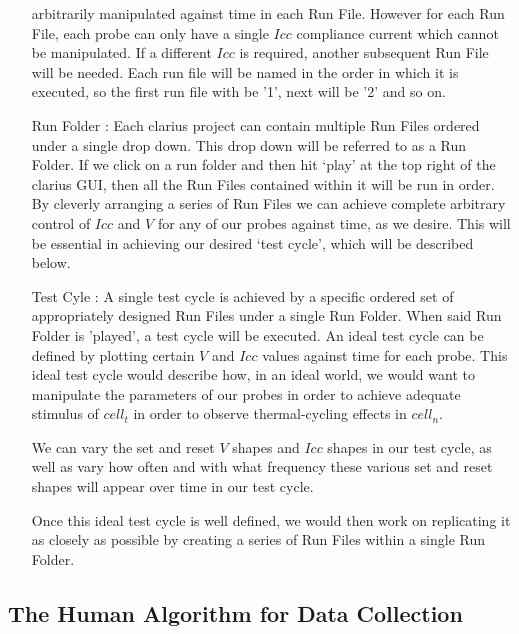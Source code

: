 \documentclass{article}
\begin{document}
\begin{enumerate}
            arbitrarily manipulated against time in each Run File. However for each Run File, each probe can only have a
            single $Icc$ compliance current which cannot be manipulated. If a different $Icc$ is required, another
            subsequent Run File will be needed. Each run file will be named in the order in which it is executed, so the
            first run file with be '1', next will be '2' and so on.
          \item[Run Folder :] Each clarius project can contain multiple Run Files ordered under a single drop down. This
            drop down will be referred to as a Run Folder. If we click on a run folder and then hit `play' at the top
            right of the clarius GUI, then all the Run Files contained within it will be run in order. By cleverly
            arranging a series of Run Files we can achieve complete arbitrary control of $Icc$ and $V$ for any of our
            probes against time, as we desire. This will be essential in achieving our desired `test cycle', which will
            be described below.
          \item[Test Cyle :] A single test cycle is achieved by a specific ordered set of appropriately designed Run
            Files under a single Run Folder. When said Run Folder is 'played', a test cycle will be executed. An ideal
            test cycle can be defined by plotting certain $V$ and $Icc$ values against time for each probe. This ideal
            test cycle would describe how, in an ideal world, we would want to manipulate the parameters of our probes
            in order to achieve adequate stimulus of $cell_t$ in order to observe thermal-cycling effects in $cell_n$. 
            
            We can vary the set and reset $V$ shapes and $Icc$ shapes in our test cycle, as well as vary how often and
            with what frequency these various set and reset shapes will appear over time in our test cycle.
      
            Once this ideal test cycle is well defined, we would then work on replicating it as closely as possible by
            creating a series of Run Files within a single Run Folder.
        \end{enumerate}

      
      \subsection{The Human Algorithm for Data Collection} \label{humanalgorithm}
\end{document}
